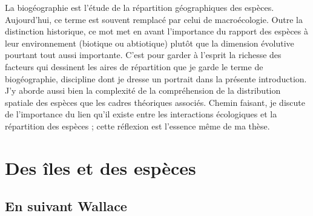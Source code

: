 \providecommand{\plusnamesingular}{}
\providecommand{\starnamesingular}{}
\providecommand{\cref}{\plusnamesingular~\ref}
\providecommand{\Cref}{\starnamesingular~\ref}
\providecommand{\crefformat}[2]{}
\providecommand{\Crefformat}[2]{}

\crefformat{figure}{fig.~#2#1#3}
\Crefformat{figure}{Figure~#2#1#3}

La biogéographie est l'étude de la répartition géographiques des
espèces. Aujourd'hui, ce terme est souvent remplacé par celui de
macroécologie. Outre la distinction historique, ce mot met en avant
l'importance du rapport des espèces à leur environnement (biotique ou
abtiotique) plutôt que la dimension évolutive pourtant tout aussi
importante. C'est pour garder à l'esprit la richesse des facteurs qui
dessinent les aires de répartition que je garde le terme de
biogéographie, discipline dont je dresse un portrait dans la présente
introduction. J'y aborde aussi bien la complexité de la compréhension de
la distribution spatiale des espèces que les cadres théoriques associés.
Chemin faisant, je discute de l'importance du lien qu'il existe entre
les interactions écologiques et la répartition des espèces ; cette
réflexion est l'essence même de ma thèse.

\section*{Des îles et des espèces}\label{des-uxeeles-et-des-espuxe8ces}

\subsection*{En suivant Wallace}\label{en-suivant-wallace}

